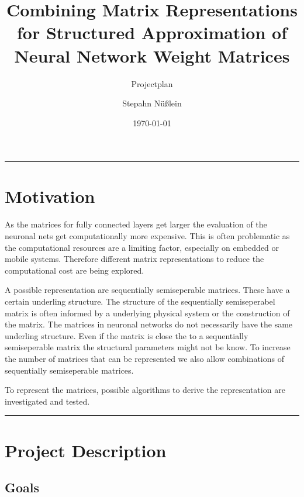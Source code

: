 \documentclass[lang=ngerman,inputenc=utf8,fontsize=10pt]{ldvarticle}
\title{Combining Matrix Representations for Structured Approximation of Neural Network Weight Matrices}
\subtitle{Projectplan}
\author{Stepahn Nüßlein}
\date{\today}
\begin{document}
	\maketitle
	\thispagestyle{empty}
	\vspace*{2cm}
	\hrule

\section*{Motivation}

As the matrices for fully connected layers get larger the evaluation of the neuronal nets get computationally more expensive. This is often problematic as the computational resources are a limiting factor, especially on embedded or mobile systems.
Therefore different matrix representations to reduce the computational cost are being explored.

A possible representation are sequentially semiseperable matrices. These have a certain underling structure.
The structure of the sequentially semiseperabel matrix is often informed by a underlying physical system or the construction of the matrix.
The matrices in neuronal networks do not necessarily have the same underling structure.
Even if the matrix is close the to a sequentially semiseperable matrix the structural parameters might not be know.
To increase the number of matrices that can be represented we also allow combinations of sequentially semiseperable matrices.

To represent the matrices, possible algorithms to derive the representation are investigated and tested.




\vspace*{1cm}
\hrule

\newpage

\section{Project Description}

\subsection*{Goals}
\end{document}

